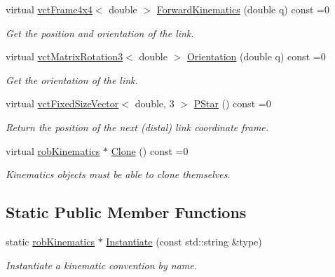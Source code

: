 \begin{DoxyCompactItemize}
virtual \hyperlink{classvct_frame4x4}{vct\+Frame4x4}$<$ double $>$ \hyperlink{classrob_kinematics_a1307677fa8f4846a62da3bf934efb9d6}{Forward\+Kinematics} (double q) const =0
\begin{DoxyCompactList}\small\item\em Get the position and orientation of the link. \end{DoxyCompactList}\item 
virtual \hyperlink{classvct_matrix_rotation3}{vct\+Matrix\+Rotation3}$<$ double $>$ \hyperlink{classrob_kinematics_ada1e684fd3b33fb8c0cfbf32f4099e83}{Orientation} (double q) const =0
\begin{DoxyCompactList}\small\item\em Get the orientation of the link. \end{DoxyCompactList}\item 
virtual \hyperlink{classvct_fixed_size_vector}{vct\+Fixed\+Size\+Vector}$<$ double, 3 $>$ \hyperlink{classrob_kinematics_a29ea3c6823445630d7d84cc38887fb3a}{P\+Star} () const =0
\begin{DoxyCompactList}\small\item\em Return the position of the next (distal) link coordinate frame. \end{DoxyCompactList}\item 
virtual \hyperlink{classrob_kinematics}{rob\+Kinematics} $\ast$ \hyperlink{classrob_kinematics_a01c1be909edee0615544e081da5ee721}{Clone} () const =0
\begin{DoxyCompactList}\small\item\em Kinematics objects must be able to clone themselves. \end{DoxyCompactList}\end{DoxyCompactItemize}
\subsection*{Static Public Member Functions}
\begin{DoxyCompactItemize}
\item 
static \hyperlink{classrob_kinematics}{rob\+Kinematics} $\ast$ \hyperlink{classrob_kinematics_ab9d416cf2f00db0c67d107b9ecc28623}{Instantiate} (const std\+::string \&type)
\begin{DoxyCompactList}\small\item\em Instantiate a kinematic convention by name. \end{DoxyCompactList}\end{DoxyCompactItemize}

